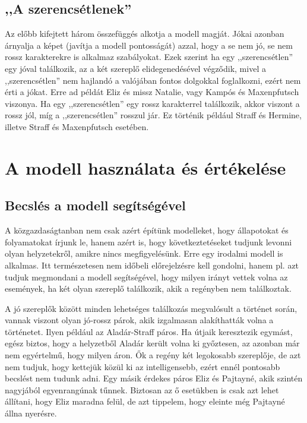 \documentclass[a4paper,12pt]{thesis-ekf}
\begin{document}
    \section{,,A szerencsétlenek''}\label{sec_a-szerencsetlenek''}

    Az előbb kifejtett három összefüggés alkotja a modell magját.
    Jókai azonban árnyalja a képet (javítja a modell pontosságát) azzal, hogy a se nem jó, se nem rossz karakterekre is
        alkalmaz szabályokat.
    Ezek szerint ha egy ,,szerencsétlen'' egy jóval találkozik, az a két szereplő elidegenedésével végződik,
    mivel a ,,szerencsétlen'' nem hajlandó a valójában fontos dolgokkal foglalkozni, ezért nem érti a jókat.
    Erre ad példát Eliz és missz Natalie, vagy Kampós és Maxenpfutsch viszonya.
    Ha egy ,,szerencsétlen'' egy rossz karakterrel találkozik, akkor viszont a rossz jól,
        míg a ,,szerencsétlen'' rosszul jár.
    Ez történik például Straff és Hermine, illetve Straff és Maxenpfutsch esetében.

    \chapter{A modell használata és értékelése}

    \section{Becslés a modell segítségével}

    A közgazdaságtanban nem csak azért építünk modelleket, hogy állapotokat és folyamatokat írjunk le, hanem azért is,
        hogy következtetéseket tudjunk levonni olyan helyzetekről, amikre nincs megfigyelésünk.
    Erre egy irodalmi modell is alkalmas.
    Itt természetesen nem időbeli előrejelzésre kell gondolni, hanem pl. azt tudjuk megmondani a modell segítségével,
        hogy milyen irányt vettek volna az események, ha két olyan szereplő találkozik, akik a regényben nem találkoztak.

    A jó szereplők között minden lehetséges találkozás megvalósult a történet során, vannak viszont olyan jó‑rossz párok,
        akik izgalmasan alakíthatták volna a történetet.
    Ilyen például az Aladár-Straff páros.
    Ha útjaik keresztezik egymást, egész biztos, hogy a helyzetből Aladár került volna ki győztesen,
        az azonban már nem egyértelmű, hogy milyen áron.
    Ők a regény két legokosabb szereplője, de azt nem tudjuk, hogy kettejük közül ki az intelligensebb,
        ezért ennél pontosabb becslést nem tudunk adni.
    Egy másik érdekes páros Eliz és Pajtayné, akik szintén nagyjából egyenrangúnak tűnnek.
    Biztosan az ő esetükben is csak azt lehet állítani, hogy Eliz maradna felül, de azt tippelem, hogy eleinte még
        Pajtayné állna nyerésre.
\end{document}

